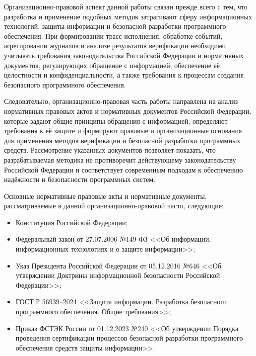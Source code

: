 
Организационно-правовой аспект данной работы связан прежде всего с тем,
что разработка и применение подобных методик затрагивают сферу
информационных технологий, защиты информации и безопасной разработки
программного обеспечения. При формировании трасс исполнения, обработке
событий, агрегировании журналов и анализе результатов верификации
необходимо учитывать требования законодательства Российской Федерации и
нормативных документов, регулирующих обращение с информацией, обеспечение
её целостности и конфиденциальности, а также требования к процессам
создания безопасного программного обеспечения.

Следовательно, организационно-правовая часть работы направлена на анализ
нормативных правовых актов и нормативных документов Российской Федерации,
которые задают общие принципы обращения с информацией, определяют
требования к её защите и формируют правовые и организационные основания
для применения методов верификации и безопасной разработки программных
средств. Рассмотрение указанных документов позволяет показать, что
разрабатываемая методика не противоречит действующему законодательству
Российской Федерации и соответствует современным подходам к обеспечению
надёжности и безопасности программных систем.

Основные нормативные правовые акты и нормативные документы,
рассматриваемые в данной организационно-правовой части, следующие:
\begin{itemize}
    \item Конституция Российской Федерации;
    \item Федеральный закон от 27.07.2006 №149-ФЗ <<Об информации, информационных технологиях и о защите информации>>;
    \item Указ Президента Российской Федерации от 05.12.2016 №646 <<Об утверждении Доктрины информационной безопасности Российской Федерации>>;
    \item ГОСТ Р 56939--2024 <<Защита информации. Разработка безопасного программного обеспечения. Общие требования>>;
    \item Приказ ФСТЭК России от 01.12.2023 №240 <<Об утверждении Порядка проведения сертификации процессов безопасной разработки программного обеспечения средств защиты информации>>.
\end{itemize}

